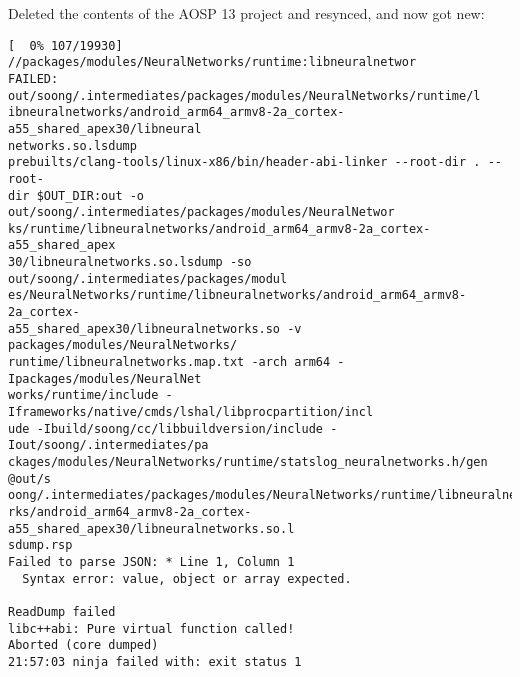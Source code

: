 Deleted the contents of the AOSP 13 project and resynced, and now got new:
\begin{lstlisting}
[  0% 107/19930] //packages/modules/NeuralNetworks/runtime:libneuralnetwor
FAILED: out/soong/.intermediates/packages/modules/NeuralNetworks/runtime/l
ibneuralnetworks/android_arm64_armv8-2a_cortex-a55_shared_apex30/libneural
networks.so.lsdump
prebuilts/clang-tools/linux-x86/bin/header-abi-linker --root-dir . --root-
dir $OUT_DIR:out -o out/soong/.intermediates/packages/modules/NeuralNetwor
ks/runtime/libneuralnetworks/android_arm64_armv8-2a_cortex-a55_shared_apex
30/libneuralnetworks.so.lsdump -so out/soong/.intermediates/packages/modul
es/NeuralNetworks/runtime/libneuralnetworks/android_arm64_armv8-2a_cortex-
a55_shared_apex30/libneuralnetworks.so -v packages/modules/NeuralNetworks/
runtime/libneuralnetworks.map.txt -arch arm64 -Ipackages/modules/NeuralNet
works/runtime/include -Iframeworks/native/cmds/lshal/libprocpartition/incl
ude -Ibuild/soong/cc/libbuildversion/include -Iout/soong/.intermediates/pa
ckages/modules/NeuralNetworks/runtime/statslog_neuralnetworks.h/gen @out/s
oong/.intermediates/packages/modules/NeuralNetworks/runtime/libneuralnetwo
rks/android_arm64_armv8-2a_cortex-a55_shared_apex30/libneuralnetworks.so.l
sdump.rsp
Failed to parse JSON: * Line 1, Column 1
  Syntax error: value, object or array expected.

ReadDump failed
libc++abi: Pure virtual function called!
Aborted (core dumped)
21:57:03 ninja failed with: exit status 1

\end{lstlisting}


